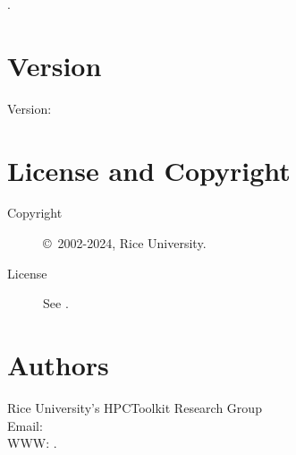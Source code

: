 \documentclass[english]{article}
\begin{document}
.

\section{Version}

Version: \Version

\section{License and Copyright}

\begin{description}
\item[Copyright] \copyright\ 2002-2024, Rice University.
\item[License] See .
\end{description}

\section{Authors}

\noindent
Rice University's HPCToolkit Research Group \\
Email:  \\
WWW: .

\LatexManEnd
\end{document}
